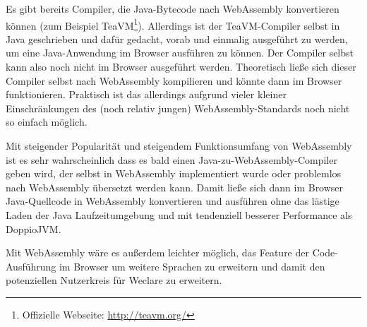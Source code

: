 Es gibt bereits Compiler, die Java-Bytecode nach WebAssembly konvertieren können (zum Beispiel TeaVM\footnote{Offizielle Webseite: \url{http://teavm.org/}}). Allerdings ist der TeaVM-Compiler selbst in Java geschrieben und dafür gedacht, vorab und einmalig ausgeführt zu werden, um eine Java-Anwendung im Browser ausführen zu können. Der Compiler selbst kann also noch nicht im Browser ausgeführt werden. Theoretisch ließe sich dieser Compiler selbst nach WebAssembly kompilieren und könnte dann im Browser funktionieren. Praktisch ist das allerdings aufgrund vieler kleiner Einschränkungen des (noch relativ jungen) WebAssembly-Standards noch nicht so einfach möglich.

Mit steigender Popularität und steigendem Funktionsumfang von WebAssembly ist es sehr wahrscheinlich dass es bald einen Java-zu-WebAssembly-Compiler geben wird, der selbst in WebAssembly implementiert wurde oder problemlos nach WebAssembly übersetzt werden kann. Damit ließe sich dann im Browser Java-Quellcode in WebAssembly konvertieren und ausführen ohne das lästige Laden der Java Laufzeitumgebung und mit tendenziell besserer Performance als DoppioJVM.

Mit WebAssembly wäre es außerdem leichter möglich, das Feature der Code-Ausführung im Browser um weitere Sprachen zu erweitern und damit den potenziellen Nutzerkreis für Weclare zu erweitern.